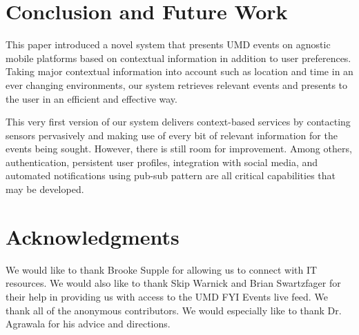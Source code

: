 \documentclass{acm_proc_article-sp}
\begin{document}
\section{Conclusion and Future Work}
This paper introduced a novel system that presents UMD events on agnostic mobile platforms based on contextual information in addition to user preferences. Taking major contextual information into account such as location and time in an ever changing environments, our system retrieves relevant events and presents to the user in an efficient and effective way.

This very first version of our system delivers context-based services by contacting sensors pervasively and making use of every bit of relevant information for the events being sought. However, there is still room for improvement. Among others, authentication, persistent user profiles, integration with social media, and automated notifications using pub-sub pattern are all critical capabilities that may be developed.  

\section{Acknowledgments}
We would like to thank Brooke Supple for allowing us to connect with IT resources. We would also like to thank Skip Warnick and Brian Swartzfage​r for their help in providing us with access to the UMD FYI Events live feed. We thank all of the anonymous contributors. We would especially like to thank Dr. Agrawala for his advice and directions.

%

%
%
\balancecolumns
\end{document}
